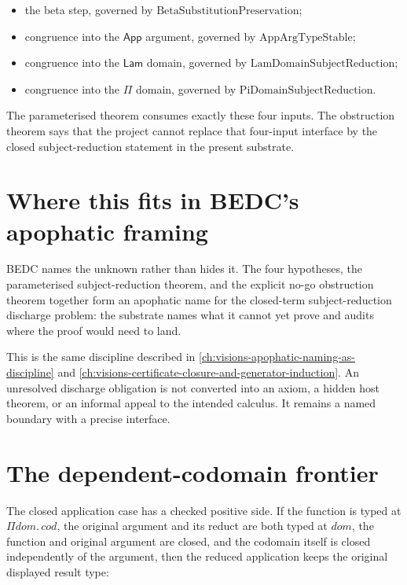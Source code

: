 \begin{itemize}
\item the beta step, governed by $\mathrm{BetaSubstitutionPreservation}$;
\item congruence into the $\mathsf{App}$ argument, governed by $\mathrm{AppArgTypeStable}$;
\item congruence into the $\mathsf{Lam}$ domain, governed by $\mathrm{LamDomainSubjectReduction}$;
\item congruence into the $\mathsf{\Pi}$ domain, governed by $\mathrm{PiDomainSubjectReduction}$.
\end{itemize}

The parameterised theorem consumes exactly these four inputs. The obstruction theorem says that the project cannot replace that four-input interface by the closed subject-reduction statement in the present substrate.

\section{Where this fits in BEDC's apophatic framing}
\label{sec:metacic-subject-reduction-apophatic-framing}

BEDC names the unknown rather than hides it. The four hypotheses, the parameterised subject-reduction theorem, and the explicit no-go obstruction theorem together form an apophatic name for the closed-term subject-reduction discharge problem: the substrate names what it cannot yet prove and audits where the proof would need to land.

This is the same discipline described in \autoref{ch:visions-apophatic-naming-as-discipline} and \autoref{ch:visions-certificate-closure-and-generator-induction}. An unresolved discharge obligation is not converted into an axiom, a hidden host theorem, or an informal appeal to the intended calculus. It remains a named boundary with a precise interface.

\section{The dependent-codomain frontier}
\label{sec:metacic-subject-reduction-dependent-codomain-frontier}

The closed application case has a checked positive side. If the function is typed at $\Pi dom.\,cod$, the original argument and its reduct are both typed at $dom$, the function and original argument are closed, and the codomain itself is closed independently of the argument, then the reduced application keeps the original displayed result type:

